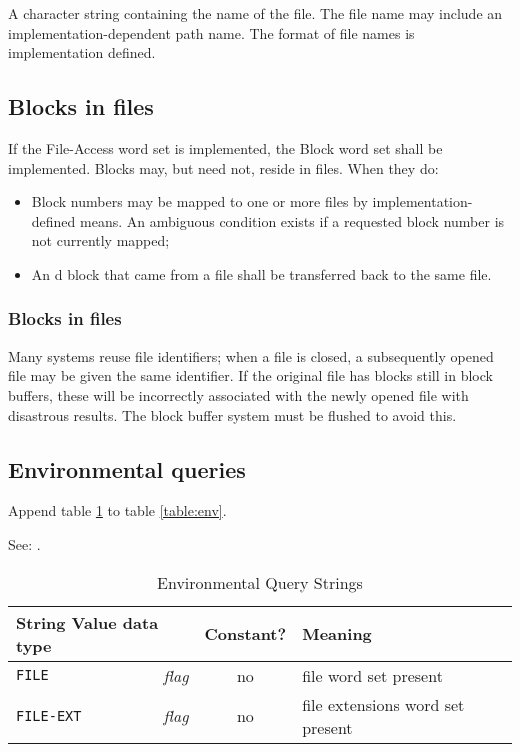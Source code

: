 A character string containing the name of the file. The file name
may include an implementation-dependent path name. The format of
file names is implementation defined.

\subsection{Blocks in files} %
\label{file:blocks}

If the File-Access word set is implemented, the Block word set
shall be implemented. Blocks may, but need not, reside in files.
When they do:
\begin{itemize}
\item Block numbers may be mapped to one or more files by
	implementation-defined means. An ambiguous condition exists
	if a requested block number is not currently mapped;
\item An d block that came from a file shall
	be transferred back to the same file.
\end{itemize}

\begin{intro}
\subsubsection{Blocks in files}

Many systems reuse file identifiers; when a file is closed, a
subsequently opened file may be given the same identifier. If the
original file has blocks still in block buffers, these will be
incorrectly associated with the newly opened file with disastrous
results. The block buffer system must be flushed to avoid this.
\end{intro}


\subsection{Environmental queries} %

Append table \ref{file:env} to table \ref{table:env}.

See: .

\begin{table}[ht]
  \begin{center}
	\caption{Environmental Query Strings}
	\label{file:env}
	\begin{tabular}{p{9em}rcp{}}
		\hline\hline
		\multicolumn{2}{l}{String \hfill Value data type} & Constant? & Meaning \\
		\hline
		\texttt{FILE}		& \emph{flag}		& no	&
			file word set present \\
		\texttt{FILE-EXT}	& \emph{flag}		& no	&
			file extensions word set present \\
		\hline\hline
	\end{tabular}
  \end{center}
\end{table}

